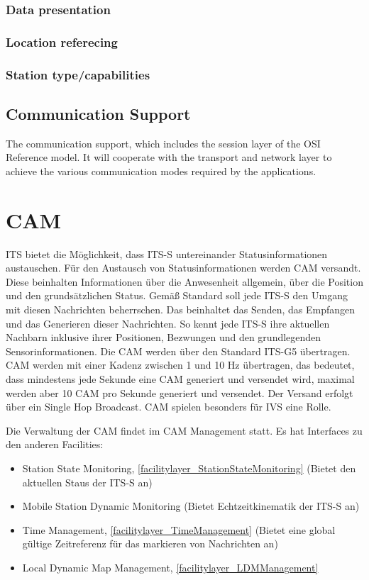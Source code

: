 \subsubsection{Data presentation}

\subsubsection{Location referecing}

\subsubsection{Station type/capabilities}

\subsection{Communication Support}
The communication support, which includes the session layer of the OSI Reference model. It will
cooperate with the transport and network layer to achieve the various communication modes required by
the applications. 

\section{CAM\label{sec:cam}}
\ac{ITS} bietet die Möglichkeit, dass \ac{ITS-S} untereinander Statusinformationen austauschen. Für den Austausch von Statusinformationen werden \ac{CAM} versandt. Diese beinhalten Informationen über die Anwesenheit allgemein, über die Position und den grundsätzlichen Status. Gemäß Standard \cite{ts102637-2} soll jede \ac{ITS-S} den Umgang mit diesen Nachrichten beherrschen. Das beinhaltet das Senden, das Empfangen und das Generieren dieser Nachrichten. So kennt jede \ac{ITS-S} ihre aktuellen Nachbarn inklusive ihrer Positionen, Bezwungen und den grundlegenden Sensorinformationen. Die \ac{CAM} werden über den Standard \ac{ITS-G5} übertragen. \ac{CAM} werden mit einer Kadenz zwischen 1 und 10 Hz übertragen, das bedeutet, dass mindestens jede Sekunde eine \ac{CAM} generiert und versendet wird, maximal werden aber 10 \ac{CAM} pro Sekunde generiert und versendet. Der Versand erfolgt über ein Single Hop Broadcast. \ac{CAM} spielen besonders für \ac{IVS} eine Rolle.

Die Verwaltung der \ac{CAM} findet im \ac{CAM} Management statt. Es hat Interfaces zu den anderen Facilities:
\begin{itemize}
	\item Station State Monitoring, \autoref{facilitylayer_StationStateMonitoring} (Bietet den aktuellen Staus der \ac{ITS-S} an)
	\item Mobile Station Dynamic Monitoring (Bietet Echtzeitkinematik der \ac{ITS-S} an)
	\item Time Management, \autoref{facilitylayer_TimeManagement} (Bietet eine global gültige Zeitreferenz für das markieren von Nachrichten an)
	\item Local Dynamic Map Management, \autoref{facilitylayer_LDMManagement}
\end{itemize}

